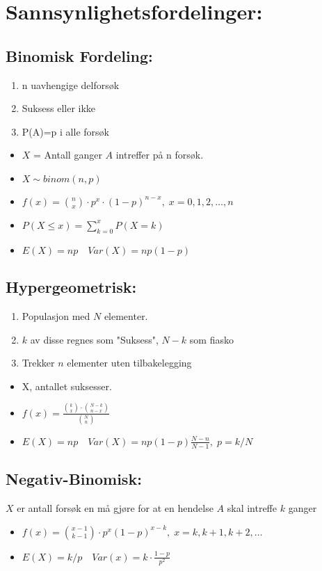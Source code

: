 \documentclass[12pt,a4paper,twocolumn,twoside]{article}
\def\forvar#1#2#3{E(#1)=#2 \quad Var(#1)=#3}
\begin{document}
\section*{Sannsynlighetsfordelinger:}
%
%
\subsection*{Binomisk Fordeling:}
\begin{enumerate}[topsep=0pt,itemsep=0pt, partopsep=0pt]
    \item n uavhengige delforsøk
    \item Suksess eller ikke
    \item P(A)=p i alle forsøk
\end{enumerate}
\begin{itemize}[topsep=0pt,itemsep=0pt, partopsep=0pt]
    \item $X$ = Antall ganger $A$ intreffer på n forsøk. 
    \item $X\sim binom(n,p)$
    \item $f(x)= \binom{n}{x} \cdot p^x\cdot (1-p)^{n-x},\; x=0,1,2,\dots,n$
    \item $P(X\leq x)= \sum_{k=0}^{x} P(X=k)$
    \item $E(X)=np\quad Var(X)=np(1-p)$
\end{itemize}
%
%
\subsection*{Hypergeometrisk:}
\begin{enumerate}[topsep=0pt,itemsep=0pt, partopsep=0pt]
    \item Populasjon med $N$ elementer.
    \item $k$ av disse regnes som "Suksess", $N-k$ som fiasko
    \item Trekker $n$ elementer uten tilbakelegging
\end{enumerate}
\begin{itemize}[topsep=0pt,itemsep=0pt, partopsep=0pt]
    \item X, antallet suksesser.
    \item $f(x)=\frac{\binom{k}{x}\cdot\binom{N-k}{n-x}}{\binom{N}{n}}$
    \item $\forvar{X}{np}{np(1-p)\frac{N-n}{N-1}},\;p=k/N$
\end{itemize}
%
%
\subsection*{Negativ-Binomisk:}
$X$ er antall forsøk en må gjøre for at en hendelse $A$ skal intreffe $k$ ganger
\begin{itemize}[topsep=0pt,itemsep=0pt, partopsep=0pt]
    \item $f(x) = \binom{x-1}{k-1}\cdot p^x(1-p)^{x-k},\;x=k,k+1,k+2,\dots$
    \item $E(X)=k/p\quad Var(x)=k\cdot\frac{1-p}{p^2}$
\end{itemize}
%
%
\end{document}
